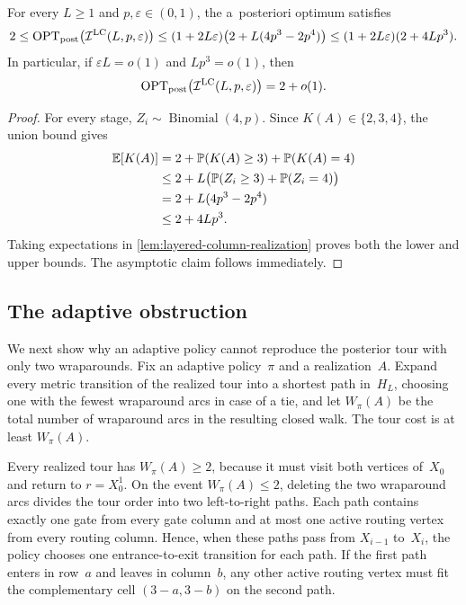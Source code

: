 \documentclass[12pt,a4paper,oneside]{report}
\begin{document}
\begin{lemma}
\label{lem:layered-column-posterior}
For every $L\ge1$ and $p,\varepsilon\in(0,1)$, the a~posteriori optimum
satisfies
\[
    2
    \le
    \operatorname{OPT}_\mathrm{post}\bigl(\mathcal I^{\mathrm{LC}}(L,p,\varepsilon)\bigr)
    \le
    (1+2L\varepsilon)
    \bigl(2+L(4p^3-2p^4)\bigr)
    \le
    (1+2L\varepsilon)(2+4Lp^3).
\]
In particular, if $\varepsilon L=o(1)$ and $Lp^3=o(1)$, then
\[
    \operatorname{OPT}_\mathrm{post}\bigl(\mathcal I^{\mathrm{LC}}(L,p,\varepsilon)\bigr)
    =2+o(1).
\]
\end{lemma}

\begin{proof}
For every stage, $Z_i\sim\operatorname{Binomial}(4,p)$.  Since
$K(A)\in\{2,3,4\}$, the union bound gives
\begin{align*}
    \mathbb{E}[K(A)]
    &=2+\mathbb{P}(K(A)\ge3)+\mathbb{P}(K(A)=4)\\
    &\le2+L\bigl(\mathbb{P}(Z_i\ge3)+\mathbb{P}(Z_i=4)\bigr)\\
    &=2+L(4p^3-2p^4)\\
    &\le2+4Lp^3.
\end{align*}
Taking expectations in \cref{lem:layered-column-realization} proves both the
lower and upper bounds.  The asymptotic claim follows immediately.
\end{proof}

\subsection{The adaptive obstruction}\label{sec:adaptive-obstruction}

We next show why an adaptive policy cannot reproduce the posterior tour with
only two wraparounds.  Fix an adaptive policy~$\pi$ and a realization~$A$.
Expand every
metric transition of the realized tour into a shortest path in~$H_L$, choosing
one with the fewest wraparound arcs in case of a tie, and let $W_\pi(A)$ be
the total number of wraparound arcs in the resulting closed walk.  The tour
cost is at least $W_\pi(A)$.

Every realized tour has $W_\pi(A)\ge2$, because it must visit both vertices
of~$X_0$ and return to $r=X_0^1$.  On the event $W_\pi(A)\le2$, deleting the
two wraparound arcs divides the tour order into two left-to-right paths.  Each
path contains exactly one gate from every gate column and at most one active
routing vertex from every routing column.  Hence, when these paths pass from
$X_{i-1}$ to~$X_i$, the policy chooses one entrance-to-exit transition for
each path.  If the first path enters in row~$a$ and leaves in column~$b$, any
other active routing vertex must fit the complementary cell $(3-a,3-b)$ on the
second path.
\end{document}
